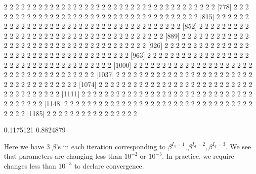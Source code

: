 \documentclass{article}
\begin{document}
\begin{Schunk}
\begin{Soutput}
 [741] 2 2 2 2 2 2 2 2 2 2 2 2 2 2 2 2 2 2 2 2 2 2 2 2 2 2 2 2 2 2 2 2 2 2 2 2 2
 [778] 2 2 2 2 2 2 2 2 2 2 2 2 2 2 2 2 2 2 2 2 2 2 2 2 2 2 2 2 2 2 2 2 2 2 2 2 2
 [815] 2 2 2 2 2 2 2 2 2 2 2 2 2 2 2 2 2 2 2 2 2 2 2 2 2 2 2 2 2 2 2 2 2 2 2 2 2
 [852] 2 2 2 2 2 2 2 2 2 2 2 2 2 2 2 2 2 2 2 2 2 2 2 2 2 2 2 2 2 2 2 2 2 2 2 2 2
 [889] 2 2 2 2 2 2 2 2 2 2 2 2 2 2 2 2 2 2 2 2 2 2 2 2 2 2 2 2 2 2 2 2 2 2 2 2 2
 [926] 2 2 2 2 2 2 2 2 2 2 2 2 2 2 2 2 2 2 2 2 2 2 2 2 2 2 2 2 2 2 2 2 2 2 2 2 2
 [963] 2 2 2 2 2 2 2 2 2 2 2 2 2 2 2 2 2 2 2 2 2 2 2 2 2 2 2 2 2 2 2 2 2 2 2 2 2
[1000] 2 2 2 2 2 2 2 2 2 2 2 2 2 2 2 2 2 2 2 2 2 2 2 2 2 2 2 2 2 2 2 2 2 2 2 2 2
[1037] 2 2 2 2 2 2 2 2 2 2 2 2 2 2 2 2 2 2 2 2 2 2 2 2 2 2 2 2 2 2 2 2 2 2 2 2 2
[1074] 2 2 2 2 2 2 2 2 2 2 2 2 2 2 2 2 2 2 2 2 2 2 2 2 2 2 2 2 2 2 2 2 2 2 2 2 2
[1111] 2 2 2 2 2 2 2 2 2 2 2 2 2 2 2 2 2 2 2 2 2 2 2 2 2 2 2 2 2 2 2 2 2 2 2 2 2
[1148] 2 2 2 2 2 2 2 2 2 2 2 2 2 2 2 2 2 2 2 2 2 2 2 2 2 2 2 2 2 2 2 2 2 2 2 2 2
[1185] 2 2 2 2 2 2 2 2 2 2 2 2 2 2 2 2
\end{Soutput}
\begin{Soutput}
[1] 0.1175121 0.8824879
\end{Soutput}
\end{Schunk}
Here we have 3 $\beta$'s in each iteration corresponding to 
$\beta^{I_g=1},\beta^{I_g=2},\beta^{I_g=3}$.
We see that parameters are changing less than $10^{-2}$ or $10^{-3}$.
In practice, we require changes less than $10^{-3}$ to declare convergence.
\end{document}
